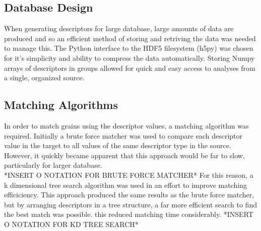 \documentclass{scrartcl}
\begin{document}
    \subsection*{Database Design}
    When generating descriptors for large database, large amounts of data are
    produced and so an efficient method of storing and retriving the data was
    needed to manage this. The Python interface to the HDF5 filesystem (h5py)
    was chosen for it's simplicity and ability to compress the data
    automatically. Storing Numpy arrays of descriptors in groups allowed for
    quick and easy access to analyses from a single, organized source.

    \subsection*{Matching Algorithms}
    In order to match grains using the descriptor values, a matching algorithm
    was required. Initially a brute force matcher was used to compare each
    descriptor value in the target to all values of the same descriptor type in
    the source. However, it quickly became apparent that this approach would be
    far to slow, particularly for larger database.\\
    *INSERT O NOTATION FOR BRUTE FORCE MATCHER*
    For this reason, a k dimensional tree search algorithm was used in an
    effort to improve matching efficiciency.  This approach produced the same
    results as the brute force matcher, but by arranging descriptors in a tree
    structure, a far more efficient search to find the best match was possible.
    this reduced matching time considerably.
    *INSERT O NOTATION FOR KD TREE SEARCH*
\end{document}
